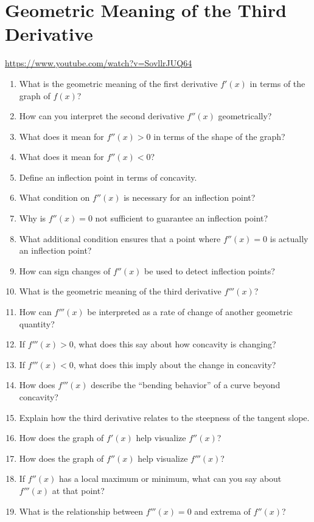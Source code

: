 \section{Geometric Meaning of the Third Derivative}

\url{https://www.youtube.com/watch?v=SovllrJUQ64}

\begin{enumerate}
  \item What is the geometric meaning of the first derivative $f'(x)$ in terms of the graph of $f(x)$?
  \item How can you interpret the second derivative $f''(x)$ geometrically?
  \item What does it mean for $f''(x) > 0$ in terms of the shape of the graph?
  \item What does it mean for $f''(x) < 0$?
  \item Define an inflection point in terms of concavity.
  \item What condition on $f''(x)$ is necessary for an inflection point?
  \item Why is $f''(x)=0$ not sufficient to guarantee an inflection point?
  \item What additional condition ensures that a point where $f''(x)=0$ is actually an inflection point?
  \item How can sign changes of $f''(x)$ be used to detect inflection points?
  \item What is the geometric meaning of the third derivative $f'''(x)$?
  \item How can $f'''(x)$ be interpreted as a rate of change of another geometric quantity?
  \item If $f'''(x) > 0$, what does this say about how concavity is changing?
  \item If $f'''(x) < 0$, what does this imply about the change in concavity?
  \item How does $f'''(x)$ describe the “bending behavior” of a curve beyond concavity?
  \item Explain how the third derivative relates to the steepness of the tangent slope.
  \item How does the graph of $f'(x)$ help visualize $f''(x)$?
  \item How does the graph of $f''(x)$ help visualize $f'''(x)$?
  \item If $f''(x)$ has a local maximum or minimum, what can you say about $f'''(x)$ at that point?
  \item What is the relationship between $f'''(x)=0$ and extrema of $f''(x)$?

\end{enumerate}
